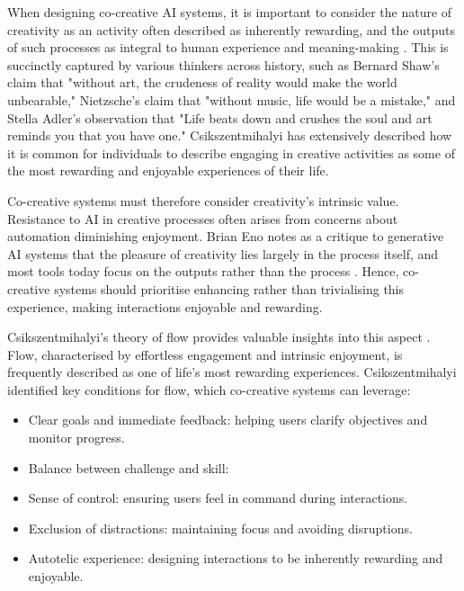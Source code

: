 When designing co-creative AI systems, it is important to consider the nature of creativity as an activity often described as inherently rewarding, and the outputs of such processes as integral to human experience and meaning-making \cite{Csikszentmihalyi1988-pg, Csikszentmihalyi1996-qq, Eno2024-rj}. This is succinctly captured by various thinkers across history, such as Bernard Shaw's claim that "without art, the crudeness of reality would make the world unbearable," Nietzsche’s claim that "without music, life would be a mistake," and Stella Adler's observation that "Life beats down and crushes the soul and art reminds you that you have one." Csikszentmihalyi \cite{Csikszentmihalyi1988-pg, Csikszentmihalyi1996-qq} has extensively described how it is common for individuals to describe engaging in creative activities as some of the most rewarding and enjoyable experiences of their life. 

Co-creative systems must therefore consider creativity’s intrinsic value. Resistance to AI in creative processes often arises from concerns about automation diminishing enjoyment. Brian Eno notes as a critique to generative AI systems that the pleasure of creativity lies largely in the process itself, and most tools today focus on the outputs rather than the process \cite{Eno2024-rj}. Hence, co-creative systems should prioritise enhancing rather than trivialising this experience, making interactions enjoyable and rewarding.

Csikszentmihalyi’s theory of flow provides valuable insights into this aspect \cite{Csikszentmihalyi1988-pg, Csikszentmihalyi1996-qq}. Flow, characterised by effortless engagement and intrinsic enjoyment, is frequently described as one of life's most rewarding experiences. Csikszentmihalyi identified key conditions for flow, which co-creative systems can leverage:

\begin{itemize}
    \item Clear goals and immediate feedback: helping users clarify objectives and monitor progress.
    \item Balance between challenge and skill: 
    \item Sense of control: ensuring users feel in command during interactions.
    \item Exclusion of distractions: maintaining focus and avoiding disruptions.
    \item Autotelic experience: designing interactions to be inherently rewarding and enjoyable.
\end{itemize}


